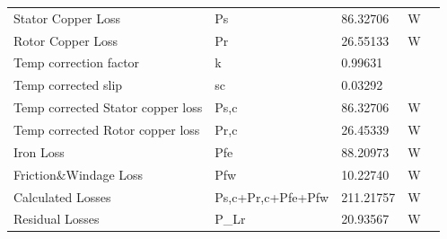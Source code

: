 \begin{table}[hbtp!]
\begin{tabular}{
    >{\columncolor[HTML]{9B9B9B}}l llll}
    Stator   Copper Loss                                & \cellcolor[HTML]{F2F2F2}Ps                & \cellcolor[HTML]{F2F2F2}86.32706  & \cellcolor[HTML]{F2F2F2}W    &  \\
    Rotor   Copper Loss                                 & Pr                                        & 26.55133                          & W                            &  \\
    Temp   correction factor                            & \cellcolor[HTML]{F2F2F2}k                 & \cellcolor[HTML]{F2F2F2}0.99631   & \cellcolor[HTML]{F2F2F2}     &  \\
    Temp corrected   slip                               & sc                                        & 0.03292                           &                              &  \\
    Temp   corrected Stator copper loss                 & \cellcolor[HTML]{F2F2F2}Ps,c              & \cellcolor[HTML]{F2F2F2}86.32706  & \cellcolor[HTML]{F2F2F2}W    &  \\
    Temp   corrected Rotor copper loss                  & Pr,c                                      & 26.45339                          & W                            &  \\
    Iron Loss                                           & \cellcolor[HTML]{F2F2F2}Pfe               & \cellcolor[HTML]{F2F2F2}88.20973  & \cellcolor[HTML]{F2F2F2}W    &  \\
    Friction\&Windage   Loss                            & Pfw                                       & 10.22740                          & W                            &  \\
    Calculated   Losses                                 & \cellcolor[HTML]{F2F2F2}Ps,c+Pr,c+Pfe+Pfw & \cellcolor[HTML]{F2F2F2}211.21757 & \cellcolor[HTML]{F2F2F2}W    &  \\
    Residual   Losses                                   & P\_Lr                                     & 20.93567                          & W                            & 
\end{tabular}
\end{table}


